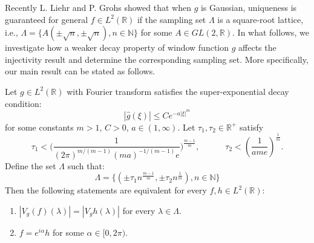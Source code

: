 \documentclass[graybox]{svmult}
\newcommand{\R}{\mathbb{R}}
\newcommand{\N}{\mathbb{N}}
\begin{document}
Recently L. Liehr and P. Grohs \cite{grohs2024phaseless} showed that when $g$ is Gaussian, uniqueness is guaranteed for general $f \in L^2(\R)$ if the sampling set $\Lambda$ is a square-root lattice, i.e., $\Lambda = \{A(\pm\sqrt{n},\pm\sqrt{n}),n \in \N\}$ for some $A \in GL(2,\R)$. In what follows, we investigate how a weaker decay property of window function $g$ affects the injectivity result and determine the corresponding sampling set. More specifically, our main result can be stated as follows.

\begin{theorem}\label{MainTheorem}
    Let $g \in L^2(\R)$ with Fourier transform satisfies the super-exponential decay condition:
    \begin{equation*}
        |\hat{g}(\xi)| \leq C e^{-a|\xi|^m}
    \end{equation*}
    for some constants $m>1$, $C>0$, $a \in (1,\infty)$. Let $\tau_1, \tau_2 \in \R^+$ satisfy
    \begin{equation*}
        \tau_1 < \big(\frac{1}{(2\pi)^{m/(m-1)}(ma)^{-1/(m-1)}e}\big)^{\frac{m-1}{m}}, \quad \quad \quad \tau_2< (\frac{1}{ame})^{\frac{1}{m}}.
    \end{equation*}
    Define the set $\Lambda$ such that: 
    \begin{equation*}
        \Lambda =  \{(\pm\tau_1n^{\frac{m-1}{m}},\pm\tau_2n^{\frac{1}{m}}),n \in \N\}
    \end{equation*} 
    Then the following statements are equivalent for every $f, h \in L^2(\R):$
    \begin{enumerate}
        \item $|V_g(f)(\lambda)| = |V_gh(\lambda)|$ for every $\lambda \in \Lambda$.
        \item $f = e^{i \alpha}h$ for some $\alpha \in [0,2\pi).$
    \end{enumerate}
\end{theorem}
\end{document}
